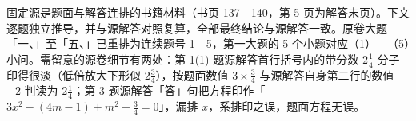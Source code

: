 

\begin{gktip}
固定源是题面与解答连排的书籍材料（书页 137—140，第 5 页为解答末页）。下文逐题独立推导，并与源解答对照复算，全部最终结论与源解答一致。原卷大题「一、」至「五、」已重排为连续题号 1—5，第一大题的 5 个小题对应（1）—（5）小问。需留意的源卷细节有两处：第 1(1) 题源解答首行括号内的带分数 $2\frac14$ 分子印得很淡（低倍放大下形似 $2\frac34$），按题面数值 $3\times\frac34$ 与源解答自身第二行的数值 $-2$ 判读为 $2\frac14$；第 3 题源解答「答」句把方程印作「$3x^2-(4m-1)+m^2+\frac34=0$」，漏排 $x$，系排印之误，题面方程无误。
\end{gktip}


